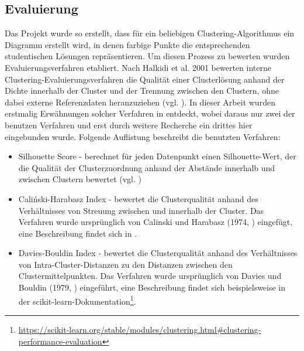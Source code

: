 \subsection{Evaluierung}
Das Projekt wurde so erstellt, dass für ein beliebigen Clustering-Algorithmus ein Diagramm erstellt wird, in denen farbige Punkte die entsprechenden studentischen Lösungen repräsentieren. Um diesen Prozess zu bewerten wurden Evaluierungsverfahren etabliert. Nach Halkidi et al. 2001 bewerten interne Clustering-Evaluierungsverfahren die Qualität einer Clusterlösung anhand der Dichte innerhalb der Cluster und der Trennung zwischen den Clustern, ohne dabei externe Referenzdaten heranzuziehen (vgl. \cite{Halkidi.2001}). In dieser Arbeit wurden erstmalig Erwähnungen solcher Verfahren in \cite{YoussefLahmadiMohammedZakariaeElKhattabiMouniaRahhaliLahcenOughdir.2024} entdeckt, wobei daraus nur zwei der benutzen Verfahren und erst durch weitere Recherche ein drittes hier eingebunden wurde. Folgende Auflistung beschreibt die benutzten Verfahren:
\begin{itemize}
    \item Silhouette Score - berechnet für jeden Datenpunkt einen Silhouette-Wert, der die Qualität der Clusterzuordnung anhand der Abstände innerhalb und zwischen Clustern bewertet (vgl. \cite{Rousseeuw.1987})
    \item Caliński-Harabasz Index - bewertet die Clusterqualität anhand des Verhältnisses von Streuung zwischen und innerhalb der Cluster. Das Verfahren wurde ursprünglich von Calinski und Harabasz (1974,  \cite{CalinskiT.andHarabaszJ..1974}) eingefügt, eine Beschreibung findet sich in \cite{Halkidi.2001}.
    \item Davies-Bouldin Index - bewertet die Clusterqualität anhand des Verhältnisses von Intra-Cluster-Distanzen zu den Distanzen zwischen den Clustermittelpunkten. Das Verfahren wurde ursprünglich von Davies und Bouldin (1979, \cite{Davies.1979}) eingeführt, eine Beschreibung findet sich beispielsweise in der scikit-learn-Dokumentation\footnote{\url{https://scikit-learn.org/stable/modules/clustering.html\#clustering-performance-evaluation}}.
\end{itemize}